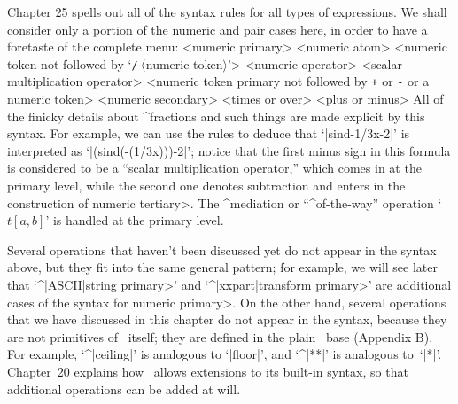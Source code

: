 {{{{\danger Chapter 25 spells out all of the syntax rules for all types of
expressions. We shall consider only a portion of the numeric and pair
cases here, in order to have a foretaste of the complete menu:
\def\\#1{\thinspace{\tt#1}\thinspace}
\beginsyntax
<numeric primary>
<numeric atom>
 \alt<numeric token not followed by %
  `{\tt/}$\thinspace\langle$numeric token$\rangle$'\thinspace>
<numeric operator>\is[sqrt]\alt[sind]\alt[cosd]\alt[mlog]\alt[mexp]
 \alt[floor]\alt[uniformdeviate]
<scalar multiplication operator>
 \alt<numeric token primary not followed by %
  {\tt+} or {\tt-} or a numeric token>
<numeric secondary>
<times or over>\is[*]
<plus or minus>\is[+]\is[++]
\endsyntax
All of the finicky details about ^{fractions} and such things are made
explicit by this syntax. For example, we can use the rules to deduce that
`|sind-1/3x-2|' is interpreted as `|(sind(-(1/3x)))-2|'; notice that the
first minus sign in this formula is considered to be a ``scalar multiplication
operator,'' which comes in at the primary level, while the second one denotes
subtraction and enters in the construction of \<numeric tertiary>. The
^{mediation} or ``^{of-the-way}'' operation `$t[a,b]$' is handled at the
primary level.

\danger Several operations that haven't been discussed yet do not appear
in the syntax above, but they fit into the same general pattern; for example,
we will see later that `^|ASCII|\<string primary>' and `^|xxpart|\<transform
primary>' are additional cases of the syntax for \<numeric primary>.
On the other hand, several operations that we have discussed in this chapter
do not appear in the syntax, because they are not primitives of \MF\ itself;
they are defined in the plain \MF\ base (Appendix B\null). For example,
`^|ceiling|' is analogous to `|floor|', and `^|**|' is analogous to~`|*|'.
Chapter~20 explains how \MF\ allows extensions to its built-in syntax,
so that additional operations can be added at will.

}}}}

